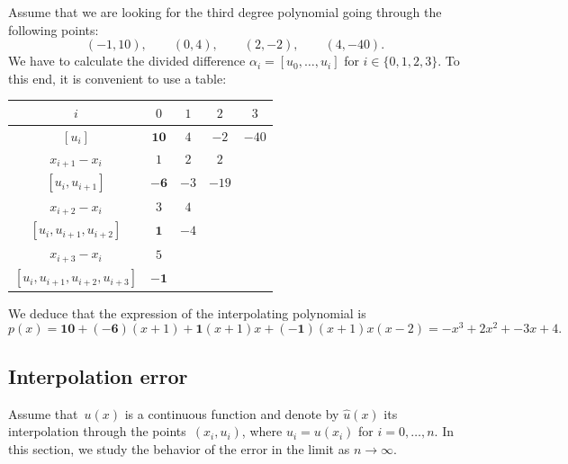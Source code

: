\begin{example}
    Assume that we are looking for the third degree polynomial going through the following points:
    \[
        (-1, 10), \qquad (0, 4), \qquad (2, -2), \qquad (4, -40).
    \]
    We have to calculate the divided difference $\alpha_i = [u_0, \dotsc, u_i]$ for $i \in \{0, 1, 2, 3\}$.
    To this end,
    it is convenient to use a table:
    \begin{center}
    \begin{tabular}{|c|c|c|c|c|}
        \hline
        $i$ & $0$ & $1$ & $2$ & $3$ \\ \hline
        $[u_i]$ & $\mathbf{10}$ & $4$ & $-2$ & $-40$ \\ \hline
        $x_{i+1} - x_{i}$ & $1$ & $2$ & $2$ &  \\ \hline
        $[u_i, u_{i+1}]$ & $\mathbf{-6}$ & $-3$ & $-19$ &  \\ \hline
        $x_{i+2} - x_{i}$ & $3$ & $4$ &  &  \\ \hline
        $[u_i, u_{i+1}, u_{i+2}]$ & $\mathbf{1}$ & $-4$ & & \\ \hline
        $x_{i+3} - x_{i}$ & $5$  & &  &  \\ \hline
        $[u_i, u_{i+1}, u_{i+2}, u_{i+3}]$ & $\mathbf{-1}$ & & & \\ \hline
    \end{tabular}
    \end{center}
    We deduce that the expression of the interpolating polynomial is
    \[
        p(x)
        = \mathbf{10} + (\mathbf{-6})(x+1) + \mathbf{1} (x+1)x + (\mathbf{-1}) (x+1)x(x-2)
        = - x^3 + 2 x^2 + -3x + 4.
    \]
\end{example}

\subsection{Interpolation error}
Assume that~$u(x)$ is a continuous function and denote by $\widehat u(x)$ its interpolation through the points~$(x_i, u_i)$,
where $u_i = u(x_i)$ for $i = 0, \dotsc, n$.
In this section, we study the behavior of the error in the limit as $n \to \infty$.


